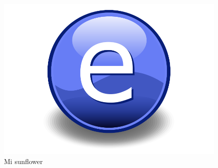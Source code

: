 \documentclass[
  letterpaper,
  12pt,
  oneside,
  spanish,
  doublespacing,
  headsepline,
  parskip]{MastersDoctoralThesis}
\begin{document}
\begin{figure}

\caption{\label{fig-sunflower}Mi sunflower}

{\centering \includegraphics{Chapters/../Figures/Electron.pdf}

}

\end{figure}
\end{document}
